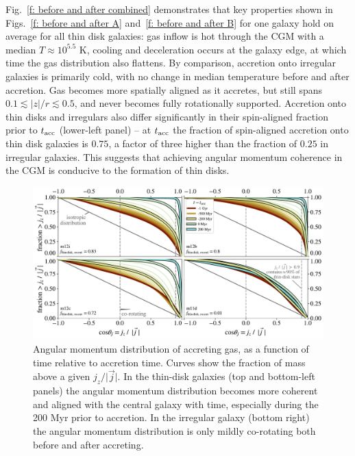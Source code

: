 \documentclass[fleqn,usenatbib]{mnras}
\newcommand{\tacc}{t_{\rm acc}}
\begin{document}
Fig.~\ref{f: before and after combined} demonstrates that key properties shown in Figs.~\ref{f: before and after A} and~\ref{f: before and after B} for one galaxy hold on average for all thin disk galaxies:
gas inflow is hot through the CGM with a median $T \approx 10^{5.5}$ K,
cooling and deceleration occurs at the galaxy edge,
at which time the gas distribution also flattens.
By comparison, accretion onto irregular galaxies is primarily cold, with no change in median temperature before and after accretion.
Gas becomes more spatially aligned as it accretes, but still spans $0.1 \lesssim \vert z \vert / r \lesssim 0.5$, and never becomes fully rotationally supported.
Accretion onto thin disks and irregulars also differ significantly in their spin-aligned fraction  prior to $\tacc$ (lower-left panel) -- at $\tacc$ the fraction of spin-aligned accretion onto thin disk galaxies is $0.75$, a factor of three higher than the fraction of $0.25$ in irregular galaxies.
This suggests that achieving angular momentum coherence in the CGM is conducive to the formation of thin disks. 

\begin{figure}
    \centering
    \includegraphics[width=\textwidth]{figures/variations/relative_to_accretion/jzjmag_vs_t.pdf}
    \caption{
    Angular momentum distribution of accreting gas, as a function of time relative to accretion time.
    Curves show the fraction of mass above a given $j_z / \vert \vec j \vert$. 
    In the thin-disk galaxies (top and bottom-left panels) the angular momentum distribution becomes more coherent and aligned with the central galaxy with time, especially during the 200 Myr prior to accretion.
    In the irregular galaxy (bottom right) the angular momentum distribution is only mildly co-rotating  both before and after accreting. 
    }
    \label{f: coherence}
\end{figure}
\end{document}
